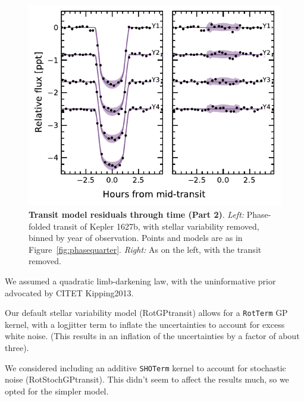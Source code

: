 \documentclass[12pt,modern,twocolumn,tighten]{aastex63}
\begin{document}
\begin{figure}[t]
	\begin{center}
		\leavevmode
		\includegraphics[width=1\textwidth]{f10.pdf}
	\end{center}
	\vspace{-0.7cm}
	\caption{
    {\bf Transit model residuals through time (Part 2)}.  
    {\it Left:}
		Phase-folded transit of Kepler 1627b, with stellar
    variability removed, binned by year of observation.
    Points and models are as in Figure~\ref{fig:phasequarter}.
    {\it Right:}
    As on the left, with the transit removed.
		\label{fig:phaseyear}
	}
\end{figure}



We assumed a quadratic limb-darkening law, with the uninformative prior
advocated by CITET Kipping2013.


Our default stellar variability model (RotGPtransit) allows for a
\texttt{RotTerm} GP kernel, with a logjitter term to inflate the
uncertainties to account for excess white noise.  (This results in an
inflation of the uncertainties by a factor of about three).

We considered including an additive \texttt{SHOTerm} kernel to account
for stochastic noise (RotStochGPtransit).  This didn't seem to affect
the results much, so we opted for the simpler model.
\end{document}
